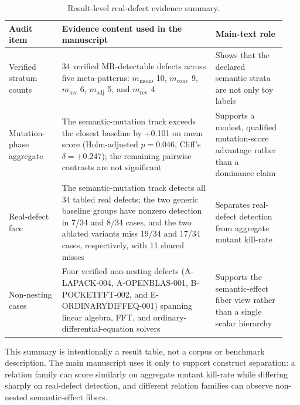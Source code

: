 \documentclass[manuscript,screen,review]{acmart}
\begin{document}
{%
\small
\begin{longtable}[]{@{}p{0.18\linewidth}p{0.52\linewidth}p{0.24\linewidth}@{}}
\caption{Result-level real-defect evidence summary.}\label{tab:realdefect-ledger}\\
\toprule\noalign{}
Audit item & Evidence content used in the manuscript & Main-text role \\
\midrule\noalign{}
\endfirsthead
\endhead
\bottomrule\noalign{}
\endlastfoot
Verified stratum counts & 34 verified MR-detectable defects across five
meta-patterns: \(m_{\mathrm{mono}}\) 10, \(m_{\mathrm{conv}}\) 9,
\(m_{\mathrm{inv}}\) 6, \(m_{\mathrm{adj}}\) 5, and
\(m_{\mathrm{rev}}\) 4 & Shows that the declared semantic strata are not
only toy labels \\
Mutation-phase aggregate & The semantic-mutation track exceeds the
closest baseline by +0.101 on mean score (Holm-adjusted \(p = 0.046\),
Cliff's \(\delta = +0.247\)); the remaining pairwise contrasts are not
significant & Supports a modest, qualified
mutation-score advantage rather than a dominance claim \\
Real-defect face & The semantic-mutation track detects all 34 tabled
real defects; the two generic baseline groups have nonzero detection in
7/34 and 8/34 cases, and the two ablated variants miss 19/34 and 17/34
cases, respectively, with 11 shared misses & Separates real-defect detection from aggregate mutant
kill-rate \\
Non-nesting cases & Four verified non-nesting defects (A-LAPACK-004,
A-OPENBLAS-001, B-POCKETFFT-002, and E-ORDINARYDIFFEQ-001) spanning
linear
algebra, FFT, and ordinary-differential-equation solvers & Supports the semantic-effect fiber view rather
than a single scalar hierarchy \\
\end{longtable}
\normalsize
}

This summary is intentionally a result table, not a corpus or benchmark
description. The main manuscript uses it only to support construct
separation: a relation family can score similarly on aggregate mutant
kill-rate while differing sharply on real-defect detection, and different
relation families can observe non-nested semantic-effect fibers.



\end{document}
